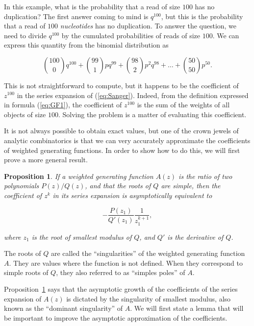 \documentclass{article}
\newtheorem{proposition}{Proposition}
\begin{document}
In this example, what is the probability that a read of size $100$ has no
duplication? The first answer coming to mind is $q^{100}$, but this is the
probability that a read of $100$ \emph{nucleotides} has no duplication. To
answer the question, we need to divide $q^{100}$ by the cumulated
probabilities of reads of size $100$. We can express this quantity from
the binomial distribution as

\begin{equation*}
{100 \choose 0}q^{100} + {99 \choose 1}pq^{99} + {98 \choose 2}p^2q^{98} +
\ldots + {50 \choose 50}p^{50}.
\end{equation*}

This is not straightforward to compute, but it happens to be the
coefficient of $z^{100}$ in the series expansion of (\ref{eq:Sanger}).
Indeed, from the definition expressed in formula (\ref{eq:GF1}), the
coefficient of $z^{100}$ is the sum of the weights of all objects of size
$100$.  Solving the problem is a matter of evaluating this coefficient.


It is not always possible to obtain exact values, but one of the crown
jewels of analytic combinatorics is that we can very accurately
approximate the coefficients of weighted generating functions.  In order
to show how to do this, we will first prove a more general result.

\begin{proposition}
\label{th:ass}
If a weighted generating function $A(z)$ is the ratio of two polynomials
$P(z)/Q(z)$, and that the roots of $Q$ are simple, then the coefficient of
$z^k$ in its series expansion is asymptotically equivalent to

\begin{equation}
\label{eq:ass}
-\frac{P(z_1)}{Q'(z_1)}\frac{1}{z_1^{k+1}},
\end{equation}

\noindent
where $z_1$ is the root of smallest modulus of $Q$,
and $Q'$ is the derivative of $Q$.
\end{proposition}

The roots of $Q$ are called the ``singularities'' of the weighted
generating function $A$. They are values where the function is not
defined. When they correspond to simple roots of $Q$, they also referred
to as ``simples poles'' of $A$.

Proposition~\ref{th:ass} says that the asymptotic growth of the
coefficients of the series expansion of $A(z)$ is dictated by the
singularity of smallest modulus, also known as the ``dominant
singularity'' of $A$. We will first state a lemma that will be
important to improve the asymptotic approximation of the coefficients.
\end{document}
